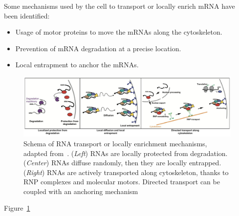 Some mechanisms used by the cell to transport or locally enrich \ac{mRNA} have been identified:
\begin{itemize}
	\item Usage of motor proteins to move the \ac{mRNA}s along the cytoskeleton.
	\item Prevention of \ac{mRNA} degradation at a precise location.
	\item Local entrapment to anchor the \ac{mRNA}s.
\end{itemize}

\begin{figure}[]
    \centering
    \includegraphics[width=\textwidth]{figures/introduction/rna_transport}
    \caption[Schema of RNA transport or locally enrichment mechanisms]{Schema of RNA transport or locally enrichment mechanisms, adapted from~\cite{Medioni_2012}.
	(\textit{Left}) RNAs are locally protected from degradation.
	(\textit{Center}) RNAs diffuse randomly, then they are locally entrapped.
	(\textit{Right}) RNAs are actively transported along cytoskeleton, thanks to RNP complexes and molecular motors.
	Directed transport can be coupled with an anchoring mechanism}
    \label{fig:rna_transport}
\end{figure}

Figure~\ref{fig:rna_transport}




